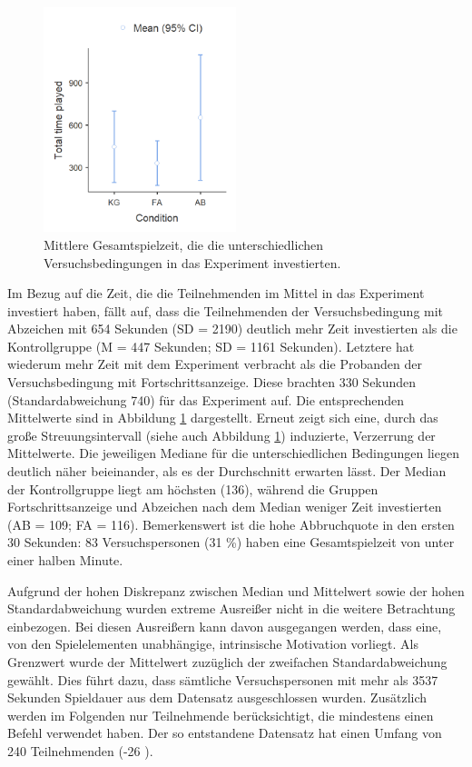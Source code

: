 \begin{figure}[htbp]
    \centering
    \includegraphics[width=0.5\textwidth]{img/auswertung/mean_time.png}
    \caption{Mittlere Gesamtspielzeit, die die unterschiedlichen Versuchsbedingungen in das Experiment investierten.}
    \label{mean_time}
\end{figure}

Im Bezug auf die Zeit, die die Teilnehmenden im Mittel in das Experiment investiert haben, fällt auf, dass die Teilnehmenden der Versuchsbedingung mit Abzeichen mit 654 Sekunden (SD = 2190) deutlich mehr Zeit investierten als die Kontrollgruppe (M = 447 Sekunden; SD = 1161 Sekunden). Letztere hat wiederum mehr Zeit mit dem Experiment verbracht als die Probanden der Versuchsbedingung mit Fortschrittsanzeige. Diese brachten 330 Sekunden (Standardabweichung 740) für das Experiment auf. Die entsprechenden Mittelwerte sind in Abbildung \ref{mean_time} dargestellt. Erneut zeigt sich eine, durch das große Streuungsintervall (siehe auch Abbildung \ref{mean_time}) induzierte, Verzerrung der Mittelwerte. Die jeweiligen Mediane für die unterschiedlichen Bedingungen liegen deutlich näher beieinander, als es der Durchschnitt erwarten lässt. Der Median der Kontrollgruppe liegt am höchsten (136), während die Gruppen Fortschrittsanzeige und Abzeichen nach dem Median weniger Zeit investierten (AB = 109; FA = 116). Bemerkenswert ist die hohe Abbruchquote in den ersten 30 Sekunden: 83 Versuchspersonen (31 \%) haben eine Gesamtspielzeit von unter einer halben Minute.

Aufgrund der hohen Diskrepanz zwischen Median und Mittelwert sowie der hohen Standardabweichung wurden extreme Ausreißer nicht in die weitere Betrachtung einbezogen. Bei diesen Ausreißern kann davon ausgegangen werden, dass eine, von den Spielelementen unabhängige, intrinsische Motivation vorliegt. Als Grenzwert wurde der Mittelwert zuzüglich der zweifachen Standardabweichung gewählt. Dies führt dazu, dass sämtliche Versuchspersonen mit mehr als 3537 Sekunden Spieldauer aus dem Datensatz ausgeschlossen wurden. Zusätzlich werden im Folgenden nur Teilnehmende berücksichtigt, die mindestens einen Befehl verwendet haben. Der so entstandene Datensatz hat einen Umfang von 240 Teilnehmenden (-26 ).

